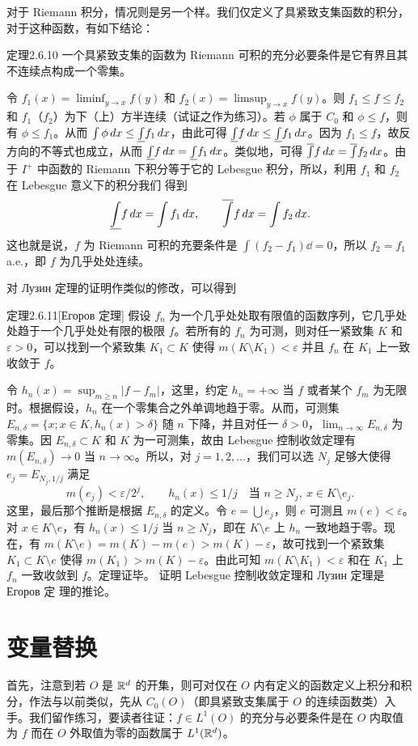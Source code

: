 对于 Riemann 积分，情况则是另一个样。我们仅定义了具紧致支集函数的积分，对于这种函数，有如下结论：
\begin{statement}{定理}{2.6.10}
一个具紧致支集的函数为 Riemann 可积的充分必要条件是它有界且其不连续点构成一个零集。
\end{statement}
\Proof 令 $f_1(x)=\liminf_{y\to x}f(y)$ 和 $f_2(x)=\limsup_{y\to x}f(y)$。则 $f_1\le f\le f_2$ 和 $f_1$（$f_2$）为下（上）方半连续（试证之作为练习）。若 $\phi$ 属于 $C_0$ 和 $\phi\le f$，则有 $\phi\le f_1$。从而 $\int\phi\,dx\le\underline{\int} f_1\,dx$，由此可得 $\underline{\int} f\,dx\le\underline{\int} f_1\,dx$。因为 $f_1\le f$，故反方向的不等式也成立，从而 $\underline{\int} f\,dx=\underline{\int} f_1\,dx$。类似地，可得 $\overline{\int} f\,dx=\overline{\int} f_2\,dx$。由于 $I^+$ 中函数的 Riemann 下积分等于它的 Lebesgue 积分，所以，利用 $f_1$ 和 $f_2$ 在 Lebesgue 意义下的积分我们
得到
\[\underline{\int} f\,dx=\int f_1\,dx,\qquad\overline{\int} f\,dx=\int f_2\,dx.\]
这也就是说，$f$ 为 Riemann 可积的充要条件是 $\int(f_2-f_1)\dd=0$，所以 $f_2=f_1$ a.e.，即 $f$ 为几乎处处连续。

对 Лузин 定理的证明作类似的修改，可以得到
\begin{statement}{定理}{2.6.11}[Егоров 定理]
假设 $f_n$ 为一个几乎处处取有限值的函数序列，它几乎处处趋于一个几乎处处有限的极限 $f$。若所有的 $f_n$ 为可测，则对任一紧致集 $K$ 和 $\varepsilon>0$，可以找到一个紧致集 $K_1\subset K$ 使得 $m(K\setminus K_1)<\varepsilon$ 并且 $f_n$ 在 $K_1$ 上一致收敛于 $f$。
\end{statement}
\Proof 令 $h_n(x)=\sup_{m\ge n}|f-f_m|$，这里，约定 $h_n=+\infty$ 当 $f$ 或者某个 $f_m$ 为无限时。根据假设，$h_n$ 在一个零集合之外单调地趋于零。从而，可测集 $E_{n,\delta}=\{x;x\in K,h_n(x)>\delta\}$ 随 $n$ 下降，并且对任一 $\delta>0$，$\lim_{n\to\infty}E_{n,\delta}$ 为零集。因 $E_{n,\delta}\subset K$ 和 $K$ 为一可测集，故由 Lebesgue 控制收敛定理有 $m(E_{n,\delta})\to0$ 当 $n\to\infty$。所以，对 $j=1,2,\ldots$，我们可以选 $N_j$ 足够大使得 $e_j=E_{N_j,1/j}$ 满足
\[m(e_j)<\varepsilon/2^j,\qquad h_n(x)\le1/j\quad\text{当 }n\ge N_j,\ x\in K\setminus e_j.\]
这里，最后那个推断是根据 $E_{n,\delta}$ 的定义。令 $e=\bigcup e_j$，则 $e$ 可测且 $m(e)<\varepsilon$。对 $x\in K\setminus e$，有 $h_n(x)\le1/j$ 当 $n\ge N_j$，即在 $K\setminus e$ 上 $h_n$ 一致地趋于零。现在，有 $m(K\setminus e)=m(K)-m(e)>m(K)-\varepsilon$，故可找到一个紧致集 $K_1\subset K\setminus e$ 使得 $m(K_1)>m(K)-\varepsilon$。由此可知 $m(K\setminus K_1)<\varepsilon$ 和在 $K_1$ 上 $f_n$ 一致收敛到 $f$。定理证毕。
\Exercise 证明 Lebesgue 控制收敛定理和 Лузин 定理是 Егоров 定
理的推论。
\section{变量替换}
首先，注意到若 $O$ 是 $\mathbb R^d$ 的开集，则可对仅在 $O$ 内有定义的函数定义上积分和积分，作法与以前类似，先从 $C_0(O)$（即具紧致支集属于 $O$ 的连续函数类）入手。我们留作练习，要读者往证：$f\in L^1(O)$ 的充分与必要条件是在 $O$ 内取值为 $f$ 而在 $O$ 外取值为零的函数属于 $L^1(\mathbb R^d)$。

